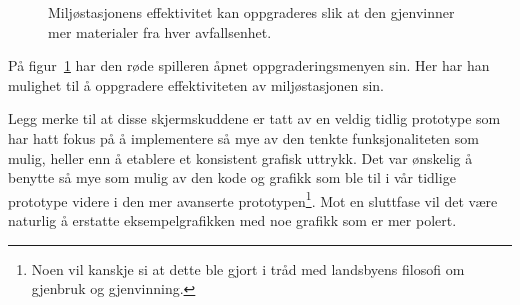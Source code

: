 \begin{figure} [H]
\centering
\setlength\fboxsep{0.2pt}
\setlength\fboxrule{0.7pt}
\caption{Miljøstasjonens effektivitet kan oppgraderes slik at den gjenvinner mer materialer fra hver avfallsenhet.}
\label{fig:OppgradereEnv}
\end{figure}

På figur~\ref{fig:OppgradereEnv} har den røde spilleren åpnet
oppgraderingsmenyen sin. Her har han mulighet til å oppgradere
effektiviteten av miljøstasjonen sin.

Legg merke til at disse skjermskuddene er tatt av en veldig tidlig
prototype som har hatt fokus på å implementere så mye av den tenkte
funksjonaliteten som mulig, heller enn å etablere et konsistent grafisk
uttrykk. Det var ønskelig å benytte så mye som mulig av den kode og
grafikk som ble til i vår tidlige prototype videre i den mer avanserte
prototypen\footnote{Noen vil kanskje si at dette ble gjort i tråd med
landsbyens filosofi om gjenbruk og gjenvinning.}. Mot en sluttfase vil
det være naturlig å erstatte eksempelgrafikken med noe grafikk som er
mer polert.

